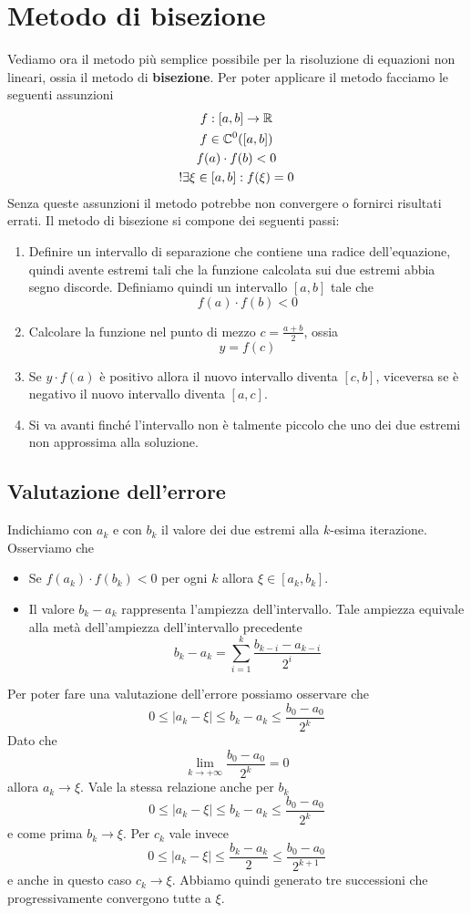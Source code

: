 \section{Metodo di bisezione}
Vediamo ora il metodo più semplice possibile per la risoluzione di equazioni non lineari, ossia il metodo di
\textbf{bisezione}. Per poter applicare il metodo facciamo le seguenti assunzioni
\begin{gather*}
	f : [a,b] \to \mathbb{R} \\
	f \in \mathbb{C}^0([a,b]) \\
	f(a) \cdot f(b) < 0 \\
	!\exists \xi \in [a, b] : f(\xi) = 0
\end{gather*}
Senza queste assunzioni il metodo potrebbe non convergere o fornirci risultati errati. Il metodo di bisezione
si compone dei seguenti passi:
\begin{enumerate}
	\item Definire un intervallo di separazione che contiene una radice dell'equazione, quindi avente estremi
	      tali che la funzione calcolata sui due estremi abbia segno discorde. Definiamo quindi un intervallo
	      $[a, b]$ tale che
	      \[ f(a) \cdot f(b) < 0 \]
	\item Calcolare la funzione nel punto di mezzo $c = \frac{a + b}{2}$, ossia
	      \[ y = f(c) \]
	\item Se $y \cdot f(a)$ è positivo allora il nuovo intervallo diventa $[c, b]$, viceversa se è negativo
	      il nuovo intervallo diventa $[a, c]$.
	\item Si va avanti finché l'intervallo non è talmente piccolo che uno dei due estremi non approssima alla
	      soluzione.
\end{enumerate}

\subsection{Valutazione dell'errore}
Indichiamo con $a_k$ e con $b_k$ il valore dei due estremi alla $k$-esima iterazione. Osserviamo che
\begin{itemize}
	\item Se $f(a_k) \cdot f(b_k) < 0$ per ogni $k$ allora $\xi \in [a_k, b_k]$.
	\item Il valore $b_k - a_k$ rappresenta l'ampiezza dell'intervallo. Tale ampiezza equivale alla metà
	      dell'ampiezza dell'intervallo precedente
	      \[ b_k - a_k = \sum_{i=1}^{k} \frac{b_{k-i} - a_{k-i}}{2^i} \]
\end{itemize}
Per poter fare una valutazione dell'errore possiamo osservare che
\[ 0 \leq |a_k - \xi| \leq b_k - a_k \leq \frac{b_0 - a_0}{2^k} \]
Dato che
\[ \lim_{k \to +\infty} \frac{b_0 - a_0}{2^k} = 0 \]
allora $a_k \to \xi$. Vale la stessa relazione anche per $b_k$
\[ 0 \leq |a_k - \xi| \leq b_k - a_k \leq \frac{b_0 - a_0}{2^k} \]
e come prima $b_k \to \xi$. Per $c_k$ vale invece
\[ 0 \leq |a_k - \xi| \leq \frac{b_k - a_k}{2} \leq \frac{b_0 - a_0}{2^{k+1}} \]
e anche in questo caso $c_k \to \xi$. Abbiamo quindi generato tre successioni che progressivamente convergono
tutte a $\xi$.


